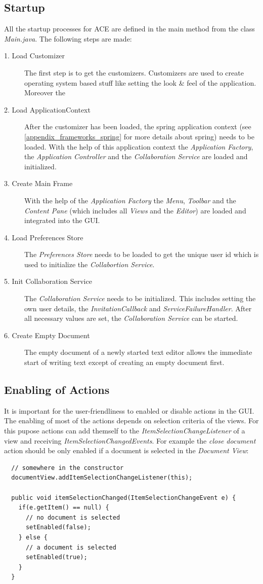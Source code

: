 \subsection{Startup}
\label{applicationlayer_wf_startup}
All the startup processes for ACE are defined in the main method from the class \textit{Main.java}. The following steps are made:
\begin{description}
\item[1. Load Customizer ] The first step is to get the customizers. Customizers are used to create operating system based stuff like setting the look \& feel of the application. Moreover the 
\item[2. Load ApplicationContext ] After the customizer has been loaded, the spring application context (see \ref{appendix_frameworks_spring} for more details about spring) needs to be loaded. With the help of this application context the \textit{Application Factory}, the \textit{Application Controller} and the \textit{Collaboration Service} are loaded and initialized.
\item[3. Create Main Frame ] With the help of the \textit{Application Factory} the \textit{Menu}, \textit{Toolbar} and the \textit{Content Pane} (which includes all \textit{Views} and the \textit{Editor}) are loaded and integrated into the GUI.
\item[4. Load Preferences Store ] The \textit{Preferences Store} needs to be loaded to get the unique user id which is used to initialize the \textit{Collabortion Service}.
\item[5. Init Collaboration Service ] The \textit{Collaboration Service} needs to be initialized. This includes setting the own user details, the \textit{InvitationCallback} and \textit{ServiceFailureHandler}. After all necessary values are set, the \textit{Collaboration Service} can be started.
\item[6. Create Empty Document ] The empty document of a newly started text editor allows the immediate start of writing text except of creating an empty document first.
\end{description}

\subsection{Enabling of Actions}
It is important for the user-friendliness to enabled or disable actions in the GUI. The enabling of most of the actions depends on selection criteria of the views. For this pupose actions can add themself to the \textit{ItemSelectionChangeListener} of a view and receiving \textit{ItemSelectionChangedEvents}.  For example the \textit{close document} action should be only enabled if a document is selected in the \textit{Document View}:
\begin{verbatim}
  // somewhere in the constructor
  documentView.addItemSelectionChangeListener(this);

  public void itemSelectionChanged(ItemSelectionChangeEvent e) {
    if(e.getItem() == null) {
      // no document is selected
      setEnabled(false);
    } else {
      // a document is selected
      setEnabled(true);
    }
  }
\end{verbatim}

